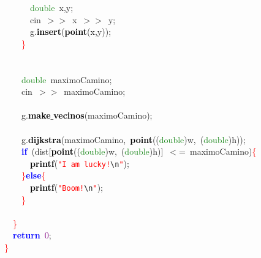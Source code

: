 \mbox{}\ \ \ \ \ \ \textcolor{ForestGreen}{double}\ x\textcolor{BrickRed}{,}y\textcolor{BrickRed}{;} \\
\mbox{}\ \ \ \ \ \ cin\ \textcolor{BrickRed}{$>$$>$}\ x\ \textcolor{BrickRed}{$>$$>$}\ y\textcolor{BrickRed}{;} \\
\mbox{}\ \ \ \ \ \ g\textcolor{BrickRed}{.}\textbf{\textcolor{Black}{insert}}\textcolor{BrickRed}{(}\textbf{\textcolor{Black}{point}}\textcolor{BrickRed}{(}x\textcolor{BrickRed}{,}y\textcolor{BrickRed}{));} \\
\mbox{}\ \ \ \ \textcolor{Red}{\}} \\
\mbox{} \\
\mbox{}\ \  \\
\mbox{}\ \ \ \ \textcolor{ForestGreen}{double}\ maximoCamino\textcolor{BrickRed}{;} \\
\mbox{}\ \ \ \ cin\ \textcolor{BrickRed}{$>$$>$}\ maximoCamino\textcolor{BrickRed}{;} \\
\mbox{} \\
\mbox{}\ \ \ \ g\textcolor{BrickRed}{.}\textbf{\textcolor{Black}{make$\_$vecinos}}\textcolor{BrickRed}{(}maximoCamino\textcolor{BrickRed}{);} \\
\mbox{} \\
\mbox{}\ \ \ \ g\textcolor{BrickRed}{.}\textbf{\textcolor{Black}{dijkstra}}\textcolor{BrickRed}{(}maximoCamino\textcolor{BrickRed}{,}\ \textbf{\textcolor{Black}{point}}\textcolor{BrickRed}{((}\textcolor{ForestGreen}{double}\textcolor{BrickRed}{)}w\textcolor{BrickRed}{,}\ \textcolor{BrickRed}{(}\textcolor{ForestGreen}{double}\textcolor{BrickRed}{)}h\textcolor{BrickRed}{));} \\
\mbox{}\ \ \ \ \textbf{\textcolor{Blue}{if}}\ \textcolor{BrickRed}{(}dist\textcolor{BrickRed}{[}\textbf{\textcolor{Black}{point}}\textcolor{BrickRed}{((}\textcolor{ForestGreen}{double}\textcolor{BrickRed}{)}w\textcolor{BrickRed}{,}\ \textcolor{BrickRed}{(}\textcolor{ForestGreen}{double}\textcolor{BrickRed}{)}h\textcolor{BrickRed}{)]}\ \textcolor{BrickRed}{$<$=}\ maximoCamino\textcolor{BrickRed}{)}\textcolor{Red}{\{} \\
\mbox{}\ \ \ \ \ \ \textbf{\textcolor{Black}{printf}}\textcolor{BrickRed}{(}\texttt{\textcolor{Red}{"{}I\ am\ lucky!}}\texttt{\textcolor{CarnationPink}{\textbackslash{}n}}\texttt{\textcolor{Red}{"{}}}\textcolor{BrickRed}{);} \\
\mbox{}\ \ \ \ \textcolor{Red}{\}}\textbf{\textcolor{Blue}{else}}\textcolor{Red}{\{} \\
\mbox{}\ \ \ \ \ \ \textbf{\textcolor{Black}{printf}}\textcolor{BrickRed}{(}\texttt{\textcolor{Red}{"{}Boom!}}\texttt{\textcolor{CarnationPink}{\textbackslash{}n}}\texttt{\textcolor{Red}{"{}}}\textcolor{BrickRed}{);} \\
\mbox{}\ \ \ \ \textcolor{Red}{\}} \\
\mbox{}\ \ \  \\
\mbox{}\ \ \textcolor{Red}{\}} \\
\mbox{}\ \ \textbf{\textcolor{Blue}{return}}\ \textcolor{Purple}{0}\textcolor{BrickRed}{;} \\
\mbox{}\textcolor{Red}{\}} \\

